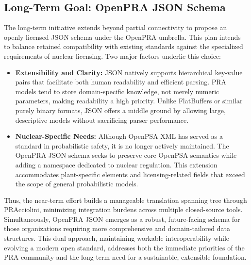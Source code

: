\subsection{Long-Term Goal: OpenPRA JSON Schema}
The long-term initiative extends beyond partial connectivity to propose an openly licensed JSON schema under the OpenPRA umbrella. This plan intends to balance retained compatibility with existing standards against the specialized requirements of nuclear licensing. Two major factors underlie this choice:

\begin{itemize}
\item \textbf{Extensibility and Clarity:} JSON natively supports hierarchical key-value pairs that facilitate both human readability and efficient parsing. PRA models tend to store domain-specific knowledge, not merely numeric parameters, making readability a high priority. Unlike FlatBuffers or similar purely binary formats, JSON offers a middle ground by allowing large, descriptive models without sacrificing parser performance.
\item \textbf{Nuclear-Specific Needs:} Although OpenPSA XML has served as a standard in probabilistic safety, it is no longer actively maintained. The OpenPRA JSON schema seeks to preserve core OpenPSA semantics while adding a namespace dedicated to nuclear regulation. This extension accommodates plant-specific elements and licensing-related fields that exceed the scope of general probabilistic models.
\end{itemize}

Thus, the near-term effort builds a manageable translation spanning tree through PRAcciolini, minimizing integration burdens across multiple closed-source tools. Simultaneously, OpenPRA JSON emerges as a robust, future-facing schema for those organizations requiring more comprehensive and domain-tailored data structures. This dual approach, maintaining workable interoperability while evolving a modern open standard, addresses both the immediate priorities of the PRA community and the long-term need for a sustainable, extensible foundation.